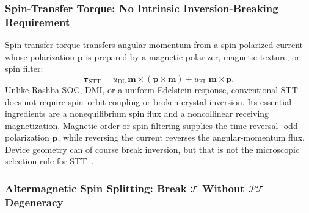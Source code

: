 \subsubsection{Spin-Transfer Torque: No Intrinsic Inversion-Breaking
    Requirement}

Spin-transfer torque transfers angular momentum from a spin-polarized current
whose polarization $\mathbf{p}$ is prepared by a magnetic polarizer, magnetic
texture, or spin filter:
\begin{equation}
    \boldsymbol{\tau}_{\mathrm{STT}}
    =u_{\mathrm{DL}}\,\mathbf{m}\times(\mathbf{p}\times\mathbf{m})
    +u_{\mathrm{FL}}\,\mathbf{m}\times\mathbf{p}.
    \label{eq:symmetry-stt}
\end{equation}
Unlike Rashba SOC, DMI, or a uniform Edelstein response, conventional STT does
not require spin--orbit coupling or broken crystal inversion.  Its essential
ingredients are a nonequilibrium spin flux and a noncollinear receiving
magnetization.  Magnetic order or spin filtering supplies the time-reversal-
odd polarization $\mathbf{p}$, while reversing the current reverses the
angular-momentum flux.  Device geometry can of course break inversion, but
that is not the microscopic selection rule for STT~\cite{sot-stt-compact-model,
    yuan2023thermal,zhu2019voltage}.

\subsubsection{Altermagnetic Spin Splitting: Break $\mathcal{T}$ Without
    $\mathcal{PT}$ Degeneracy}

